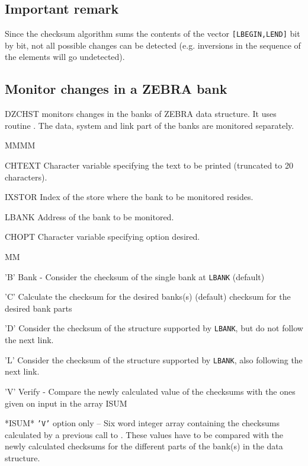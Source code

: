 \subsection{Important remark}
\par Since the checksum algorithm
sums the contents of the vector {\tt[LBEGIN,LEND]}
bit by bit, not all possible changes can be detected (e.g. inversions
in the sequence of the elements will go undetected).
\subsection{Monitor changes in a ZEBRA bank}
\par {\Rind DZCHST} monitors changes in the banks of ZEBRA data structure.
It uses routine .
The data, system and link part of the banks are monitored separately.
\Idesc
\begin{DL}{MMMM}
\item[CHTEXT]Character variable specifying the text to be printed
(truncated to 20 characters).
\item[IXSTOR]Index of the store where the bank to be monitored resides.
\item[LBANK]Address of the bank to be monitored.
\item[CHOPT]Character variable specifying option desired.
\begin{DL}{MM}
\item['B']Bank - Consider the checksum of the single bank at {\tt LBANK} (default)
\item['C']Calculate the checksum for the desired banks(s) (default)
 checksum for the desired bank parts
\item['D']Consider the checksum of the
structure supported by {\tt LBANK}, but do not follow the next link.
\item['L']Consider the checksum of the
structure supported by {\tt LBANK}, also following the next link.
\item['V']Verify - Compare the newly calculated value of the checksums with the
ones given on input in the array ISUM
\end{DL}
\item[*ISUM*]{\tt'V'} option only -- Six word integer array containing the
checksums calculated by a previous call to . These values have to
be compared with the newly calculated checksums for the different
parts of the bank(s) in the data structure.
\end{DL}
